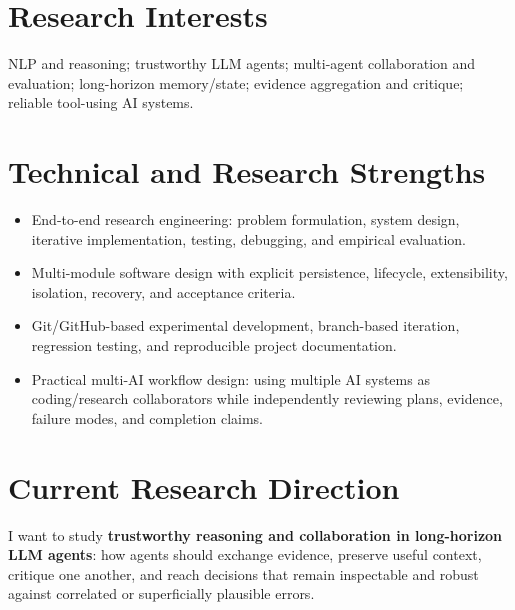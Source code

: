 \documentclass[10pt,a4paper]{article}
\begin{document}
\section{Research Interests}
NLP and reasoning; trustworthy LLM agents; multi-agent collaboration and evaluation; long-horizon memory/state; evidence aggregation and critique; reliable tool-using AI systems.

\section{Technical and Research Strengths}
\begin{itemize}
  \item End-to-end research engineering: problem formulation, system design, iterative implementation, testing, debugging, and empirical evaluation.
  \item Multi-module software design with explicit persistence, lifecycle, extensibility, isolation, recovery, and acceptance criteria.
  \item Git/GitHub-based experimental development, branch-based iteration, regression testing, and reproducible project documentation.
  \item Practical multi-AI workflow design: using multiple AI systems as coding/research collaborators while independently reviewing plans, evidence, failure modes, and completion claims.
\end{itemize}

\section{Current Research Direction}
I want to study \textbf{trustworthy reasoning and collaboration in long-horizon LLM agents}: how agents should exchange evidence, preserve useful context, critique one another, and reach decisions that remain inspectable and robust against correlated or superficially plausible errors.
\end{document}
